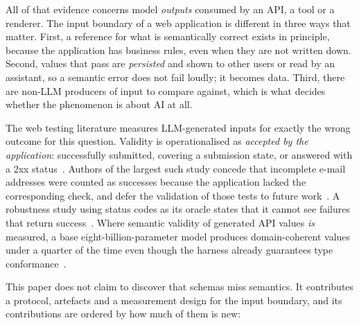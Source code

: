 \documentclass[conference]{IEEEtran}
\begin{document}
All of that evidence concerns model \emph{outputs} consumed by an API, a tool or a renderer. The
input boundary of a web application is different in three ways that matter. First, a reference for
what is semantically correct exists in principle, because the application has business rules, even
when they are not written down. Second, values that pass are \emph{persisted} and shown to other
users or read by an assistant, so a semantic error does not fail loudly; it becomes data. Third,
there are non-LLM producers of input to compare against, which is what decides whether the
phenomenon is about AI at all.

The web testing literature measures LLM-generated inputs for exactly the wrong outcome for this
question. Validity is operationalised as \emph{accepted by the application}: successfully submitted,
covering a submission state, or answered with a 2xx status~\cite{li2026webformtest,alian2024formnexus}.
Authors of the largest such study concede that incomplete e-mail addresses were counted as successes
because the application lacked the corresponding check, and defer the validation of those tests to
future work~\cite{li2026webformtest}. A robustness study using status codes as its oracle states
that it cannot see failures that return success~\cite{tigulla2026robustness}. Where semantic
validity of generated API values \emph{is} measured, a base eight-billion-parameter model produces
domain-coherent values under a quarter of the time even though the harness already guarantees
type conformance~\cite{kim2025llamaresttest}.

This paper does not claim to discover that schemas miss semantics. It contributes a protocol,
artefacts and a measurement design for the input boundary, and its contributions are ordered by how
much of them is new:
\end{document}
